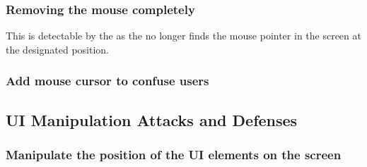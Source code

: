 \subsubsection{Removing the mouse completely}
This is detectable by the \device as the \device no longer finds the mouse pointer in the screen at the designated position.  
\subsubsection{Add mouse cursor to confuse users}

\subsection{UI Manipulation Attacks and Defenses}
\subsubsection{Manipulate the position of the UI elements on the screen}
\fi